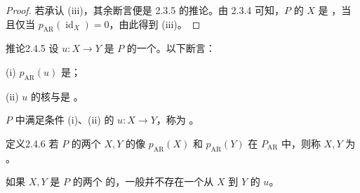 \begin{proof}若承认 (iii)，其余断言便是 2.3.5 的推论。由 2.3.4 可知，$P$ 的 $X$ 是 ，当且仅当 $p_{\mathrm{AR}}(\operatorname{id}_X)=0$，由此得到 (iii)。\end{proof}
\begin{SGAresult}{推论}{2.4.5}
设 $u:X\to Y$ 是 $P$ 的一个。以下断言：

(i) $p_{\mathrm{AR}}(u)$ 是；

(ii) $u$ 的核与是 。
\end{SGAresult}
 $P$ 中满足条件 (i)、(ii) 的 $u:X\to Y$，称为 。
\begin{SGAresult}{定义}{2.4.6}
若 $P$ 的两个 $X,Y$ 的像 $p_{\mathrm{AR}}(X)$ 和 $p_{\mathrm{AR}}(Y)$ 在 $P_{\mathrm{AR}}$ 中，则称 $X,Y$ 为 。
\end{SGAresult}
如果 $X,Y$ 是 $P$ 的两个 的，一般并不存在一个从 $X$ 到 $Y$ 的  $u$。

